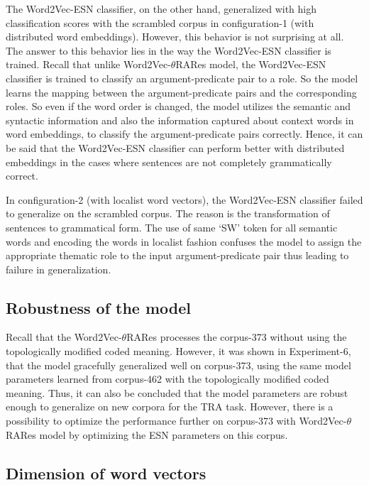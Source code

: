The Word2Vec-ESN classifier, on the other hand, generalized with high classification scores with the scrambled corpus in configuration-1 (with distributed word embeddings). However, this behavior is not surprising at all. The answer to this behavior lies in the way the Word2Vec-ESN classifier is trained. Recall that unlike Word2Vec-$\theta$RARes model, the Word2Vec-ESN classifier is trained to classify an argument-predicate pair to a role. So the model learns the mapping between the argument-predicate pairs and the corresponding roles. So even if the word order is changed, the model utilizes the semantic and syntactic information and also the information captured about context words in word embeddings, to classify the argument-predicate pairs correctly. Hence, it can be said that the Word2Vec-ESN classifier can perform better with distributed embeddings in the cases where sentences are not completely grammatically correct.

In configuration-2 (with localist word vectors), the Word2Vec-ESN classifier failed to generalize on the scrambled corpus. The reason is the transformation of sentences to grammatical form. The use of same `SW' token for all semantic words and encoding the words in localist fashion confuses the model to assign the appropriate thematic role to the input argument-predicate pair thus leading to failure in generalization. 

\subsection{Robustness of the model}

Recall that the Word2Vec-$\theta$RARes processes the corpus-373 without using the topologically modified coded meaning. However, it was shown in Experiment-6, that the model gracefully generalized well on corpus-373, using the same model parameters learned from corpus-462 with the topologically modified coded meaning. Thus, it can also be concluded that the model parameters are robust enough to generalize on new corpora for the TRA task. However, there is a possibility to optimize the performance further on corpus-373 with Word2Vec-$\theta$RARes model by optimizing the ESN parameters on this corpus.

\subsection{Dimension of word vectors}

